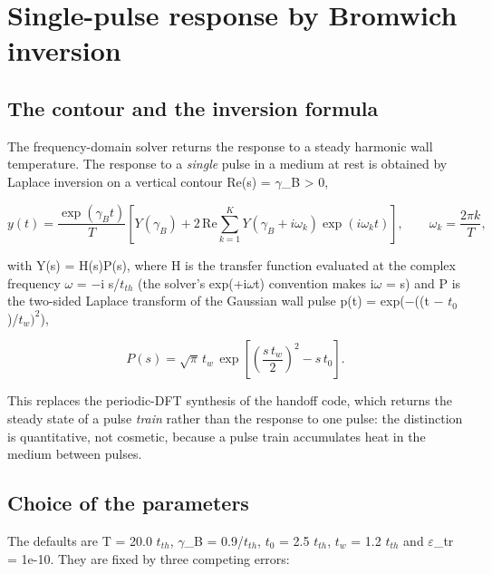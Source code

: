 \documentclass[preprint,12pt]{elsarticle}
\begin{document}
\section{Single-pulse response by Bromwich inversion}
\label{sec:8}

\subsection{The contour and the inversion formula}
\label{sec:8.1}

The frequency-domain solver returns the response to a steady harmonic wall temperature. The response to a \emph{single} pulse in a medium at rest is obtained by Laplace inversion on a vertical contour Re(s) = $\gamma$\_B > 0,

\begin{equation}
y(t)=\frac{\exp(\gamma_B t)}{T}\left[Y(\gamma_B)+2\,\mathrm{Re}\sum_{k=1}^{K}Y\!\left(\gamma_B+i\omega_k\right)\exp\left(i\omega_k t\right)\right],\qquad\omega_k=\frac{2\pi k}{T}, 
\label{eq:22}
\end{equation}

with Y(s) = H(s)P(s), where H is the transfer function evaluated at the complex frequency $\omega$ = $-$i s/$t_{th}$ (the solver's exp(+i$\omega$t) convention makes i$\omega$ = s) and P is the two-sided Laplace transform of the Gaussian wall pulse p(t) = exp($-$((t $-$ $t_{0}$)/$t_{w})^{2}$),

\begin{equation}
P(s)=\sqrt{\pi}\,t_w\,\exp\!\left[\left(\frac{s\,t_w}{2}\right)^2-s\,t_0\right]. 
\label{eq:23}
\end{equation}

This replaces the periodic-DFT synthesis of the handoff code, which returns the steady state of a pulse \emph{train} rather than the response to one pulse: the distinction is quantitative, not cosmetic, because a pulse train accumulates heat in the medium between pulses.

\subsection{Choice of the parameters}
\label{sec:8.2}

The defaults are T = 20.0 $t_{th}$, $\gamma$\_B = 0.9/$t_{th}$, $t_{0}$ = 2.5 $t_{th}$, $t_{w}$ = 1.2 $t_{th}$ and $\varepsilon$\_tr = 1e-10. They are fixed by three competing errors:
\end{document}
